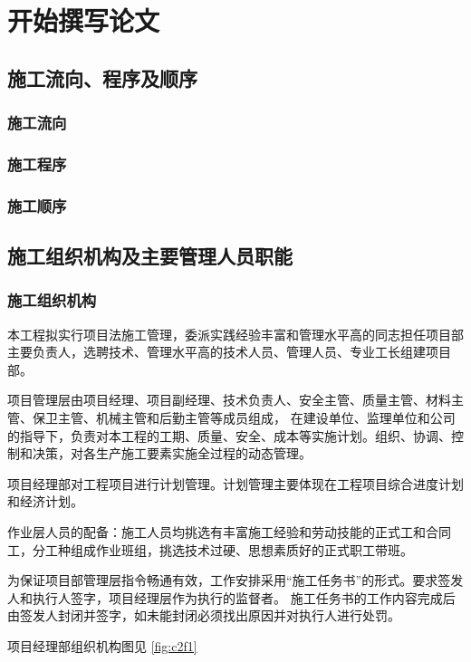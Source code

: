 \section{开始撰写论文}
\subsection{施工流向、程序及顺序}
\subsubsection{施工流向}
\subsubsection{施工程序}
\subsubsection{施工顺序}

\subsection{施工组织机构及主要管理人员职能}
\subsubsection{施工组织机构}

本工程拟实行项目法施工管理，委派实践经验丰富和管理水平高的同志担任项目部主要负责人，选聘技术、管理水平高的技术人员、管理人员、专业工长组建项目部。

项目管理层由项目经理、项目副经理、技术负责人、安全主管、质量主管、材料主管、保卫主管、机械主管和后勤主管等成员组成，
在建设单位、监理单位和公司的指导下，负责对本工程的工期、质量、安全、成本等实施计划。组织、协调、控制和决策，对各生产施工要素实施全过程的动态管理。

项目经理部对工程项目进行计划管理。计划管理主要体现在工程项目综合进度计划和经济计划。

作业层人员的配备：施工人员均挑选有丰富施工经验和劳动技能的正式工和合同工，分工种组成作业班组，挑选技术过硬、思想素质好的正式职工带班。

为保证项目部管理层指令畅通有效，工作安排采用“施工任务书”的形式。要求签发人和执行人签字，项目经理层作为执行的监督者。
施工任务书的工作内容完成后由签发人封闭并签字，如未能封闭必须找出原因并对执行人进行处罚。

项目经理部组织机构图见 \ref{fig:c2f1}

